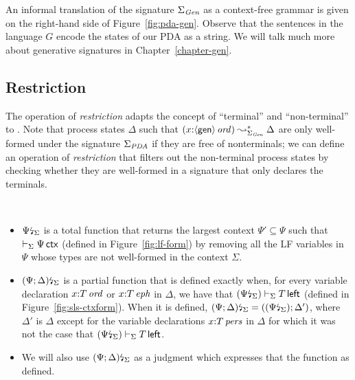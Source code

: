 An informal translation of the signature $\Sigma_{\it Gen}$ as a
context-free grammar is given on the right-hand side of
Figure~\ref{fig:pda-gen}. Observe that the sentences in the language
$G$ encode the states of our PDA as a string. We will talk much more
about generative signatures in Chapter~\ref{chapter-gen}.

\subsection{Restriction}
\label{sec:framework-restriction}

The operation of {\it restriction} adapts the concept of ``terminal''
and ``non-terminal'' to \sls. Note that process states $\Delta$
such that $(x{:}{\langle {\sf gen} \rangle}\,{{\it ord}}) \leadsto^*_{\Sigma_{\it Gen}}
\Delta$ are only well-formed under the signature $\Sigma_{\it PDA}$ if
they are free of nonterminals; we can define an operation of {\it
  restriction} that filters out the non-terminal process states by
checking whether they are well-formed in a signature that only
declares the terminals.

\bigskip
\begin{definition}[Restriction]~
\begin{itemize}
\item
  ${\Psi}{\mbox{\lightning}}_{\Sigma}$ is a total function that returns the
  largest context $\Psi' \subseteq \Psi$ such that $\vdash_\Sigma
  \Psi\,{\sf ctx}$ (defined in Figure~\ref{fig:lf-form}) by removing
  all the LF variables in $\Psi$ whose types are not well-formed in
  the context $\Sigma$.

\item
  ${(\Psi; \Delta)}{\mbox{\lightning}}_{\Sigma}$ is a partial function that is
  defined exactly when, for every variable declaration
  $x{:}{T}\,{{\it ord}}$ or $x{:}{T}\,{{\it eph}}$ in $\Delta$, we have that
  $({\Psi}{\mbox{\lightning}}_{\Sigma}) \vdash_\Sigma T\,{\sf left}$ (defined
  in Figure~\ref{fig:sls-ctxform}). When it is defined,
  ${(\Psi; \Delta)}{\mbox{\lightning}}_{\Sigma} = (({\Psi}{\mbox{\lightning}}_{\Sigma});
  \Delta')$, where $\Delta'$ is $\Delta$ except for the variable
  declarations $x{:}{T}\,{{\it pers}}$ in $\Delta$ for which it was not the
  case that $({\Psi}{\mbox{\lightning}}_{\Sigma}) \vdash_\Sigma T\,{\sf
    left}$.

\item
  We will also use ${(\Psi; \Delta)}{\mbox{\lightning}}_{\Sigma}$ as a
  judgment which expresses that the function as defined.

\end{itemize}
\end{definition}
\bigskip

